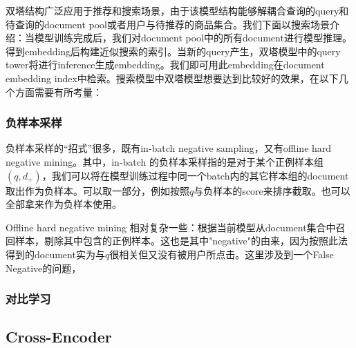 双塔结构广泛应用于推荐和搜索场景，由于该模型结构能够解耦合查询的query和待查询的document pool或者用户与待推荐的商品集合。我们下面以搜索场景介绍：当模型训练完成后，我们对document pool中的所有document进行模型推理。得到embedding后构建近似搜索的索引。当新的query产生，双塔模型中的query tower将进行inference生成embedding。我们即可用此embedding在document embedding index中检索。搜索模型中双塔模型想要达到比较好的效果，在以下几个方面需要有所考量：

\subsubsection{负样本采样}

负样本采样的“招式”很多，既有in-batch negative sampling，又有offline hard negative mining。其中，in-batch 的负样本采样指的是对于某个正例样本组$(q,d_+)$，我们可以将在模型训练过程中同一个batch内的其它样本组的document取出作为负样本。可以取一部分，例如按照$q$与负样本的score来排序截取。也可以全部拿来作为负样本使用。

Offline hard negative mining 相对复杂一些：根据当前模型从document集合中召回样本，剔除其中包含的正例样本。这也是其中"negative"的由来，因为按照此法得到的document实为与$q$很相关但又没有被用户所点击。这里涉及到一个False Negative的问题，

\subsubsection{对比学习}






\subsection{Cross-Encoder}
